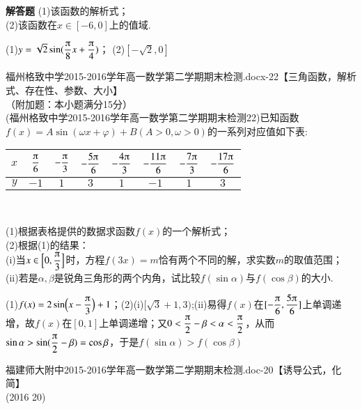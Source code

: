 \begin{exercise}{\bf 解答题}
      (1)该函数的解析式；\\
      (2)该函数在$x\in[-6,0]$上的值域.
      \begin{answer}
        (1)$y=\sqrt{2}\sin(\dfrac{\piup}8x+\dfrac{\piup}4)$；
        (2)$[-\sqrt{2},0]$
      \end{answer}
    \item 福州格致中学2015-2016学年高一数学第二学期期末检测.docx-22【三角函数，解析式、存在性、参数、大小】\\
      （附加题：本小题满分15分）\\
      (福州格致中学2015-2016学年高一数学第二学期期末检测22)已知函数$f(x)=A\sin(\omega x+\varphi)+B (A>0,\omega>0)$的一系列对应值如下表:
      \begin{center}
        \renewcommand{\arraystretch}{1.4}
        \begin{tabular}{|*{8}{c|}}
          \hline
            $x$
            &$\dfrac{\piup}6$
            &$-\dfrac{\piup}3$
            &$-\dfrac{5\piup}6$
            &$-\dfrac{4\piup}3$
            &$-\dfrac{11\piup}6$
            &$-\dfrac{7\piup}3$
            &$-\dfrac{17\piup}6$\\
          \hline
            $y$
            &$-1$
            &$1$
            &$3$
            &$1$
            &$-1$
            &$1$
            &$3$\\
          \hline
        \end{tabular}\\
      \end{center}
      (1)根据表格提供的数据求函数$f(x)$的一个解析式；\\
      (2)根据(1)的结果：\\
      \;(i)当$x\in\Bigl[0,\dfrac{\piup}3\Bigr]$时，方程$f(3x)=m$恰有两个不同的解，求实数$m$的取值范围；\\
      \;(ii)若是$\alpha,\beta$是锐角三角形的两个内角，试比较$f(\sin \alpha)$与$f(\cos \beta)$的大小.
      \begin{answer}
        (1)$f(x)=2\sin\Bigl(x-\dfrac{\piup}3\Bigr)+1$；(2)(i)$[\sqrt{3}+1,3)$;(ii)易得$f(x)$在$[-\dfrac{\piup}6,\dfrac{5\piup}6]$上单调递增，故$f(x)$在$[0,1]$上单调递增；又$0<\dfrac{\piup}2-\beta<\alpha<\dfrac{\piup}2$，从而$\sin\alpha>\sin(\dfrac{\piup}2-\beta)=\cos\beta$，于是$f(\sin \alpha)>f(\cos \beta)$
      \end{answer}
    \item 福建师大附中2015-2016学年高一数学第二学期期末检测.doc-20【诱导公式，化简】\\
      (2016  20)

\end{exercise}
